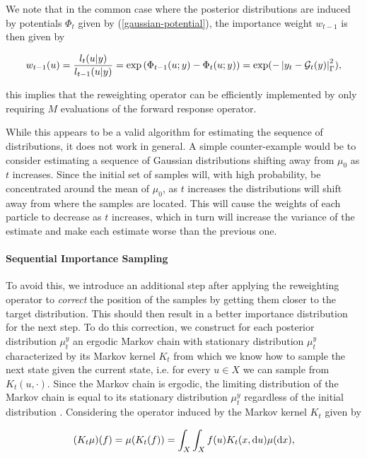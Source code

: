 We note that in the common case where the posterior distributions are induced by potentials $\Phi_t$ given by (\ref{gaussian-potential}), the importance weight $w_{t-1}$ is then given by

\begin{equation}\label{simple-weights}
  w_{t-1}(u) = \frac{l_t(u|y)}{l_{t-1}(u|y)} = \exp\left(\Phi_{t-1}(u;y) - \Phi_t(u;y)\right) = \exp(-\left|y_t - \mathcal{G}_t(y)\right|^2_\Gamma),
\end{equation}

this implies that the reweighting operator can be efficiently implemented by only requiring $M$ evaluations of the forward response operator.

While this appears to be a valid algorithm for estimating the sequence of distributions, it does not work in general. A simple counter-example would be to consider estimating a sequence of Gaussian distributions shifting away from $\mu_0$ as $t$ increases. Since the initial set of samples will, with high probability, be concentrated around the mean of $\mu_0$, as $t$ increases the distributions will shift away from where the samples are located. This will cause the weights of each particle to decrease as $t$ increases, which in turn will increase the variance of the estimate and make each estimate worse than the previous one.

\paragraph{Sequential Importance Sampling} To avoid this, we introduce an additional step after applying the reweighting operator to \textit{correct} the position of the samples by getting them closer to the target distribution. This should then result in a better importance distribution for the next step. To do this correction, we construct for each posterior distribution $\mu^y_t$ an ergodic Markov chain with stationary distribution $\mu^y_t$ characterized by its Markov kernel $K_t$ from which we know how to sample the next state given the current state, i.e. for every $u \in X$ we can sample from $K_t(u, \cdot)$. Since the Markov chain is ergodic, the limiting distribution of the Markov chain is equal to its stationary distribution $\mu^y_t$ regardless of the initial distribution \cite[Chapter 6]{Robert}. Considering the operator induced by the Markov kernel $K_t$ given by

\begin{equation*}
  (K_t\mu)(f) = \mu(K_t(f)) = \int_X\int_X f(u) K_t(x, \text{d} u) \mu(\text{d} x),
\end{equation*}

